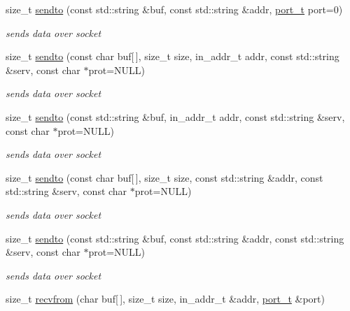 \begin{CompactItemize}
size\_\-t \hyperlink{classsocketpp_1_1BaseSocket_8f98eff253e52ccf3463a0379a10caf2}{sendto} (const std::string \&buf, const std::string \&addr, \hyperlink{namespacesocketpp_5517ef80f249b891a2ba64b95fc1e723}{port\_\-t} port=0)
\begin{CompactList}\small\item\em sends data over socket \item\end{CompactList}\item 
size\_\-t \hyperlink{classsocketpp_1_1BaseSocket_0154d562be27c8b2aa074d5f6bb8ab03}{sendto} (const char buf\mbox{[}$\,$\mbox{]}, size\_\-t size, in\_\-addr\_\-t addr, const std::string \&serv, const char $\ast$prot=NULL)
\begin{CompactList}\small\item\em sends data over socket \item\end{CompactList}\item 
size\_\-t \hyperlink{classsocketpp_1_1BaseSocket_4afc9ac34b702af852f2b52e68a90c3e}{sendto} (const std::string \&buf, in\_\-addr\_\-t addr, const std::string \&serv, const char $\ast$prot=NULL)
\begin{CompactList}\small\item\em sends data over socket \item\end{CompactList}\item 
size\_\-t \hyperlink{classsocketpp_1_1BaseSocket_c0bbca9725a55a2e6a822536efd31b73}{sendto} (const char buf\mbox{[}$\,$\mbox{]}, size\_\-t size, const std::string \&addr, const std::string \&serv, const char $\ast$prot=NULL)
\begin{CompactList}\small\item\em sends data over socket \item\end{CompactList}\item 
size\_\-t \hyperlink{classsocketpp_1_1BaseSocket_5fd9737270ee71d2292e70ed625d63f9}{sendto} (const std::string \&buf, const std::string \&addr, const std::string \&serv, const char $\ast$prot=NULL)
\begin{CompactList}\small\item\em sends data over socket \item\end{CompactList}\item 
size\_\-t \hyperlink{classsocketpp_1_1BaseSocket_11ebe50d7ae76c21ef55d38cb87cc700}{recvfrom} (char buf\mbox{[}$\,$\mbox{]}, size\_\-t size, in\_\-addr\_\-t \&addr, \hyperlink{namespacesocketpp_5517ef80f249b891a2ba64b95fc1e723}{port\_\-t} \&port)

\end{CompactItemize}
